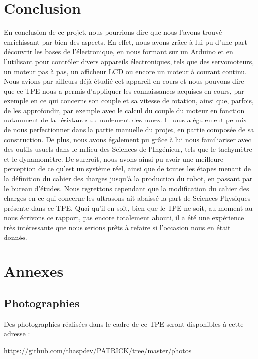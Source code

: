 \documentclass[12pt,a4paper]{article}
\begin{document}
	\section{Conclusion}
	
	\indent\indent En conclusion de ce projet, nous pourrions dire que nous l’avons trouvé enrichissant par bien des aspects. En effet, nous avons grâce à lui pu d’une part découvrir les bases de l’électronique, en nous formant sur un Arduino et en l’utilisant pour contrôler divers appareils électroniques, tels que des servomoteurs, un moteur pas à pas, un afficheur LCD ou encore un moteur à courant continu. Nous avions par ailleurs déjà étudié cet appareil en cours et nous pouvons dire que ce TPE nous a permis d’appliquer les connaissances acquises en cours, par exemple en ce qui concerne son couple et sa vitesse de rotation, ainsi que, parfois, de les approfondir, par exemple avec le calcul du couple du moteur en fonction notamment de la résistance au roulement des roues. Il nous a également permis de nous perfectionner dans la partie manuelle du projet, en partie composée de sa construction. De plus, nous avons également pu grâce à lui nous familiariser avec des outils usuels dans le milieu des Sciences de l’Ingénieur, tels que le tachymètre et le dynamomètre. De surcroît, nous avons ainsi pu avoir une meilleure perception de ce qu’est un système réel, ainsi que de toutes les étapes menant de la définition du cahier des charges jusqu’à la production du robot, en passant par le bureau d’études. Nous regrettons cependant que la modification du cahier des charges en ce qui concerne les ultrasons ait abaissé la part de Sciences Physiques présente dans ce TPE. Quoi qu'il en soit, bien que le TPE ne soit, au moment au nous écrivons ce rapport, pas encore totalement abouti, il a été une expérience très intéressante que nous serions prêts à refaire si l'occasion nous en était donnée.
	\newpage
	\section{Annexes}
	
	\subsection{Photographies}
	
\indent\indent Des photographies réalisées dans le cadre de ce TPE seront disponibles à cette adresse :
	
	\begin{center}
	\url{https://github.com/thaspdev/PATRICK/tree/master/photos}
	\end{center}
	
\end{document}

